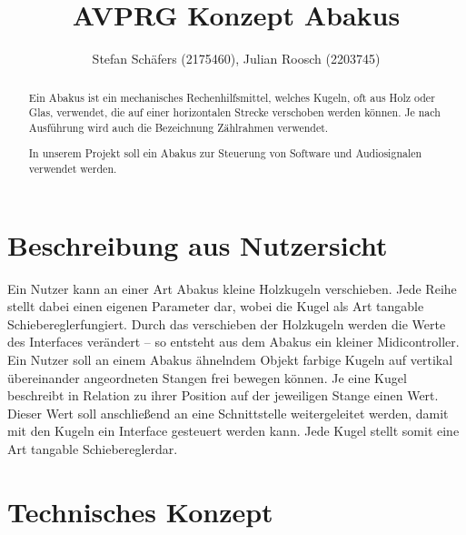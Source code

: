 \documentclass[12pt]{Article}
\title{AVPRG Konzept \glqq Abakus\grqq}
\author{ Stefan Schäfers (2175460), Julian Roosch (2203745)}
\begin{document}
\maketitle
\begin{abstract}
Ein Abakus ist ein mechanisches Rechenhilfsmittel, welches Kugeln, oft aus Holz oder Glas, verwendet, die auf einer horizontalen Strecke verschoben werden können. Je nach Ausführung wird auch die Bezeichnung Zählrahmen verwendet.

In unserem Projekt soll ein Abakus zur Steuerung von Software und Audiosignalen verwendet werden.
\end{abstract}
\section{Beschreibung aus Nutzersicht}
%
Ein Nutzer kann an einer Art Abakus kleine Holzkugeln verschieben. Jede Reihe stellt dabei einen eigenen Parameter dar, wobei die Kugel als Art \glqq tangable Schieberegler\grqq  fungiert. Durch das verschieben der Holzkugeln werden die Werte des Interfaces verändert -- so entsteht aus dem Abakus ein kleiner Midicontroller.
%
Ein Nutzer soll an einem Abakus ähnelndem Objekt farbige Kugeln auf vertikal übereinander angeordneten Stangen frei bewegen können. Je eine Kugel beschreibt in Relation zu ihrer Position auf der jeweiligen Stange einen Wert. Dieser Wert soll anschließend an eine Schnittstelle weitergeleitet werden, damit mit den Kugeln ein Interface gesteuert werden kann. Jede Kugel stellt somit eine Art \glqq tangable Schieberegler\grqq dar.


\section{Technisches Konzept}
\end{document}
